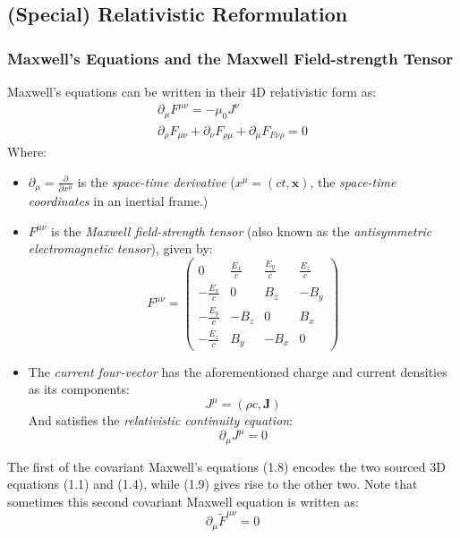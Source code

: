 \documentclass[a4paper]{article}
\numberwithin{equation}{section}
\begin{document}
\subsection{(Special) Relativistic Reformulation}
\subsubsection{Maxwell's Equations and the Maxwell Field-strength Tensor}
Maxwell's equations can be written in their 4D relativistic form as:
\begin{gather}
\partial_\mu F^{\mu \nu} = - \mu_0 J^{\nu} \label{M1} \\
\partial_\rho F_{\mu \nu} + \partial_\nu F_{\rho \mu}+\partial_\mu F_{F \nu \rho}=0 \label{M2}
\end{gather}
Where:
\begin{itemize}
\item $\partial_\mu = \frac{\partial}{\partial x^{\mu}}$ is the \textit{space-time derivative} ($x^\mu = (ct, \mathbf{x})$, the \textit{space-time coordinates} in an inertial frame.)
\item $F^{\mu \nu}$ is the \textit{Maxwell field-strength tensor} (also known as the \textit{antisymmetric electromagnetic tensor}), given by:
\begin{equation}
F^{\mu \nu}=
\begin{pmatrix}
0 & \frac{E_x}{c} & \frac{E_y}{c} & \frac{E_z}{c} \\
-\frac{E_x}{c} & 0 & B_z & -B_y \\
-\frac{E_y}{c} & -B_z & 0 & B_x \\
-\frac{E_z}{c} & B_y & -B_x & 0
\end{pmatrix}
\end{equation}
\item The \textit{current four-vector} has the aforementioned charge and current densities as its components:
\begin{equation}
J^{\mu}=(\rho c , \mathbf{J})
\end{equation}
And satisfies the \textit{relativistic continuity equation}:
\begin{equation}
\partial_\mu J^{\mu}=0
\end{equation}
\end{itemize}
The first of the covariant Maxwell's equations (1.8) encodes the two sourced 3D equations (1.1) and (1.4), while (1.9) gives rise to the other two. Note that sometimes this second covariant Maxwell equation is written as:
\begin{equation}
\partial_\mu \tilde{F}^{\mu \nu} = 0 
\end{equation}
\end{document}
